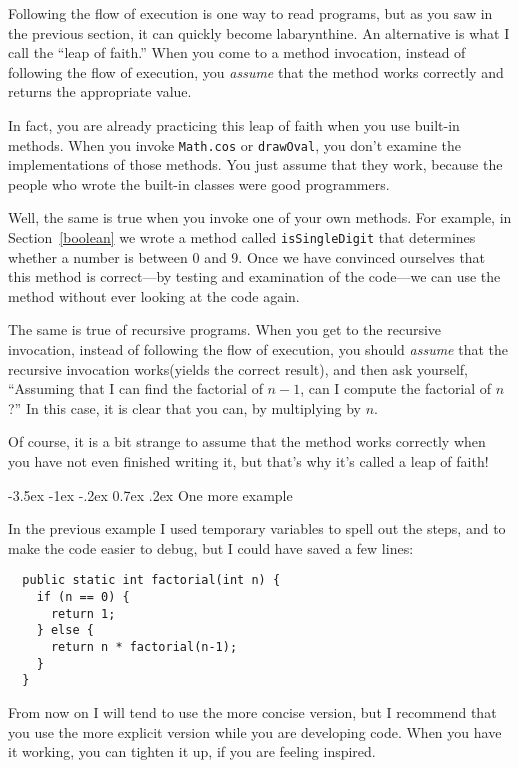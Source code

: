 \documentclass{book}
\makeatletter
\renewcommand{\section}{\@startsection 
    {section} {1} {0mm}%
    {-3.5ex \@plus -1ex \@minus -.2ex}%
    {0.7ex \@plus.2ex}%
    {\normalfont\Large\bfseries}}
\makeatother
\begin{document}
Following the flow of execution is one way to read programs, but as
you saw in the previous section, it can quickly become labarynthine.
An alternative is what I call the ``leap of faith.''  When you come to
a method invocation, instead of following the flow of execution, you
{\em assume} that the method works correctly and returns the
appropriate value.

In fact, you are already practicing this leap of faith
when you use built-in methods.  When you invoke {\tt Math.cos}
or {\tt drawOval}, you don't examine the implementations of 
those methods.  You just assume that they work, because the people
who wrote the built-in classes were good programmers.

Well, the same is true when you invoke one of your own methods.
For example, in Section~\ref{boolean} we wrote a method called
{\tt isSingleDigit} that determines whether a number is between
0 and 9.  Once we have convinced ourselves that this method
is correct---by testing and examination of the code---we can
use the method without ever looking at the code again.

The same is true of recursive programs.  When you get to
the recursive invocation, instead of following the flow of
execution, you should {\em assume} that the recursive invocation
works(yields the correct result), and then ask yourself,
``Assuming that I can find the factorial of $n-1$, can I
compute the factorial of $n$?''  In this case, it is clear
that you can, by multiplying by $n$.

Of course, it is a bit strange to assume that the method
works correctly when you have not even finished writing it,
but that's why it's called a leap of faith!

\section{One more example}
\label{factorial}

In the previous example I used temporary variables to spell out the
steps, and to make the code easier to debug, but I could have saved a
few lines:

\begin{verbatim}
  public static int factorial(int n) {
    if (n == 0) {
      return 1;
    } else {
      return n * factorial(n-1);
    }
  }
\end{verbatim}
%
From now on I will tend to use the more concise version, but
I recommend that you use the more explicit version while you
are developing code.   When you have it working, you can
tighten it up, if you are feeling inspired.
\end{document}
